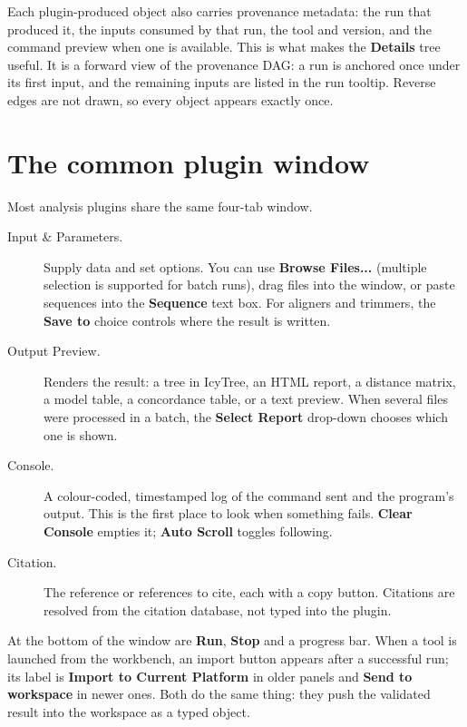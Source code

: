 \documentclass[10pt]{report}
\begin{document}
Each plugin-produced object also carries provenance metadata: the run that
produced it, the inputs consumed by that run, the tool and version, and the
command preview when one is available. This is what makes the
\textbf{Details} tree useful. It is a forward view of the provenance DAG: a
run is anchored once under its first input, and the remaining inputs are
listed in the run tooltip. Reverse edges are not drawn, so every object
appears exactly once.

\section{The common plugin window}

Most analysis plugins share the same four-tab window.

\begin{description}
  \item[Input \& Parameters.] Supply data and set options. You can use
        \textbf{Browse Files...} (multiple selection is supported for batch
        runs), drag files into the window, or paste sequences into the
        \textbf{Sequence} text box. For aligners and trimmers, the
        \textbf{Save to} choice controls where the result is written.
  \item[Output Preview.] Renders the result: a tree in IcyTree, an HTML
        report, a distance matrix, a model table, a concordance table, or a
        text preview. When several files were processed in a batch, the
        \textbf{Select Report} drop-down chooses which one is shown.
  \item[Console.] A colour-coded, timestamped log of the command sent and the
        program's output. This is the first place to look when something
        fails. \textbf{Clear Console} empties it; \textbf{Auto Scroll} toggles
        following.
  \item[Citation.] The reference or references to cite, each with a copy
        button. Citations are resolved from the citation database, not typed
        into the plugin.
\end{description}

At the bottom of the window are \textbf{Run}, \textbf{Stop} and a progress bar.
When a tool is launched from the workbench, an import button appears after a
successful run; its label is \textbf{Import to Current Platform} in older
panels and \textbf{Send to workspace} in newer ones. Both do the same thing:
they push the validated result into the workspace as a typed object.
\end{document}
